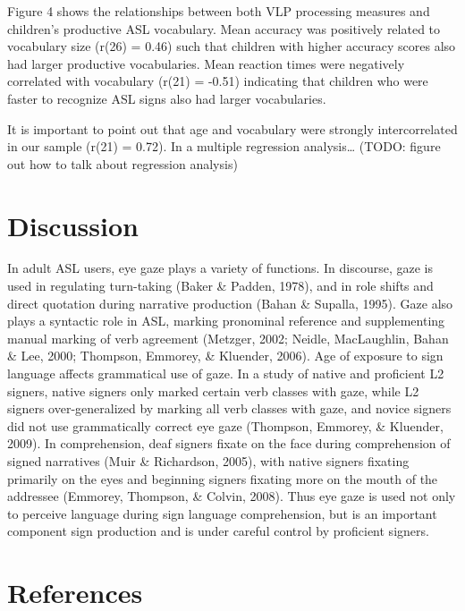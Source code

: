 \documentclass[12pt,]{article}
\begin{document}
Figure 4 shows the relationships between both VLP processing measures
and children's productive ASL vocabulary. Mean accuracy was positively
related to vocabulary size (r(26) = 0.46) such that children with higher
accuracy scores also had larger productive vocabularies. Mean reaction
times were negatively correlated with vocabulary (r(21) = -0.51)
indicating that children who were faster to recognize ASL signs also had
larger vocabularies.

It is important to point out that age and vocabulary were strongly
intercorrelated in our sample (r(21) = 0.72). In a multiple regression
analysis\ldots{} (TODO: figure out how to talk about regression
analysis)

\section{Discussion}\label{discussion}

In adult ASL users, eye gaze plays a variety of functions. In discourse,
gaze is used in regulating turn-taking (Baker \& Padden, 1978), and in
role shifts and direct quotation during narrative production (Bahan \&
Supalla, 1995). Gaze also plays a syntactic role in ASL, marking
pronominal reference and supplementing manual marking of verb agreement
(Metzger, 2002; Neidle, MacLaughlin, Bahan \& Lee, 2000; Thompson,
Emmorey, \& Kluender, 2006). Age of exposure to sign language affects
grammatical use of gaze. In a study of native and proficient L2 signers,
native signers only marked certain verb classes with gaze, while L2
signers over-generalized by marking all verb classes with gaze, and
novice signers did not use grammatically correct eye gaze (Thompson,
Emmorey, \& Kluender, 2009). In comprehension, deaf signers fixate on
the face during comprehension of signed narratives (Muir \& Richardson,
2005), with native signers fixating primarily on the eyes and beginning
signers fixating more on the mouth of the addressee (Emmorey, Thompson,
\& Colvin, 2008). Thus eye gaze is used not only to perceive language
during sign language comprehension, but is an important component sign
production and is under careful control by proficient signers.

\newpage 

\section*{References}\label{references}
\end{document}
